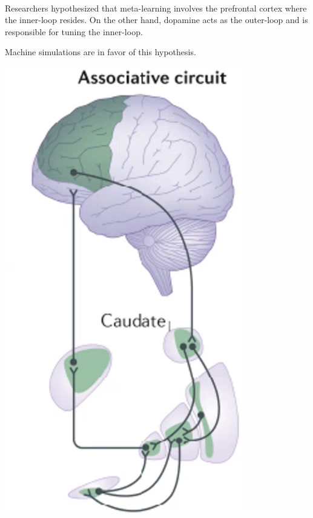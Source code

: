\begin{casestudy}
    \phantom{}\\
    \begin{minipage}{0.7\linewidth}
        Researchers hypothesized that meta-learning involves the prefrontal cortex where the inner-loop resides.
        On the other hand, dopamine acts as the outer-loop and is responsible for tuning the inner-loop.
    
        Machine simulations are in favor of this hypothesis.
    \end{minipage}
    \begin{minipage}{0.2\linewidth}
        \centering
        \includegraphics[width=0.7\linewidth]{./img/meta_learning_mapping.png}
    \end{minipage}
\end{casestudy}

